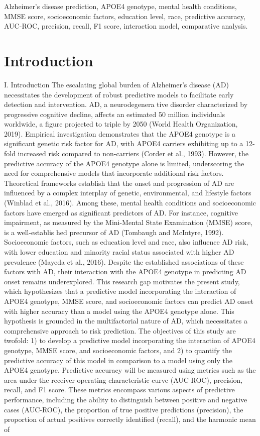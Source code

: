 \documentclass[conference]{IEEEtran}
\begin{document}
\begin{IEEEkeywords}
Alzheimer's disease prediction, APOE4 genotype, mental health conditions, MMSE score, socioeconomic factors, education level, race, predictive accuracy, AUC-ROC, precision, recall, F1 score, interaction model, comparative analysis.
\end{IEEEkeywords}

\section{Introduction}
I. Introduction The escalating global burden of Alzheimer's disease (AD) necessitates the development of robust predictive models to facilitate early detection and intervention. AD, a neurodegenera tive disorder characterized by progressive cognitive decline, affects an estimated 50 million individuals worldwide, a figure projected to triple by 2050 (World Health Organization, 2019). Empirical investigation demonstrates that the APOE4 genotype is a significant genetic risk factor for AD, with APOE4 carriers exhibiting up to a 12-fold increased risk compared to non-carriers (Corder et al., 1993). However, the predictive accuracy of the APOE4 genotype alone is limited, underscoring the need for comprehensive models that incorporate additional risk factors. Theoretical frameworks establish that the onset and progression of AD are influenced by a complex interplay of genetic, environmental, and lifestyle factors (Winblad et al., 2016). Among these, mental health conditions and socioeconomic factors have emerged as significant predictors of AD. For instance, cognitive impairment, as measured by the Mini-Mental State Examination (MMSE) score, is a well-establis hed precursor of AD (Tombaugh and McIntyre, 1992). Socioeconomic factors, such as education level and race, also influence AD risk, with lower education and minority racial status associated with higher AD prevalence (Mayeda et al., 2016). Despite the established associations of these factors with AD, their interaction with the APOE4 genotype in predicting AD onset remains underexplored. This research gap motivates the present study, which hypothesizes that a predictive model incorporating the interaction of APOE4 genotype, MMSE score, and socioeconomic factors can predict AD onset with higher accuracy than a model using the APOE4 genotype alone. This hypothesis is grounded in the multifactorial nature of AD, which necessitates a comprehensive approach to risk prediction. The objectives of this study are twofold: 1) to develop a predictive model incorporating the interaction of APOE4 genotype, MMSE score, and socioeconomic factors, and 2) to quantify the predictive accuracy of this model in comparison to a model using only the APOE4 genotype. Predictive accuracy will be measured using metrics such as the area under the receiver operating characteristic curve (AUC-ROC), precision, recall, and F1 score. These metrics encompass various aspects of predictive performance, including the ability to distinguish between positive and negative cases (AUC-ROC), the proportion of true positive predictions (precision), the proportion of actual positives correctly identified (recall), and the harmonic mean of 
\end{document}
